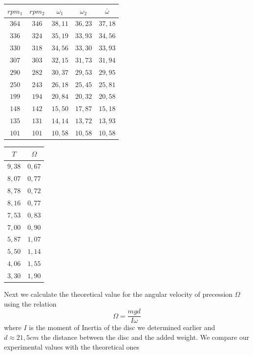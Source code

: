 \documentclass{scrartcl}
\begin{document}
 \medskip
 \centering
 \begin{tabular}{|c|c|c|c|c|}
    \hline
    $rpm_1$ & $rpm_2$ & $\omega_1$ & $\omega_2$ & $\bar{\omega}$ \\
    \hline
    $364$ & $346$ & $38,11$ & $36,23$ & $37,18$ \\
    \hline
    $336$ & $324$ & $35,19$ & $33,93$ & $34,56$ \\
    \hline
    $330$ & $318$ & $34,56$ & $33,30$ & $33,93$ \\
    \hline
    $307$ & $303$ & $32,15$ & $31,73$ & $31,94$ \\
    \hline
    $290$ & $282$ & $30,37$ & $29,53$ & $29,95$ \\
    \hline
    $250$ & $243$ & $26,18$ & $25,45$ & $25,81$ \\
    \hline
    $199$ & $194$ & $20,84$ & $20,32$ & $20,58$ \\
    \hline
    $148$ & $142$ & $15,50$ & $17,87$ & $15,18$ \\
    \hline
    $135$ & $131$ & $14,14$ & $13,72$ & $13,93$ \\
    \hline
    $101$ & $101$ & $10,58$ & $10,58$ & $10,58$ \\
    \hline
\end{tabular}
  \quad
   \begin{tabular}{|c|c|}
    \hline
   $T$ & $\Omega$ \\
   \hline
   $9,38$ & $0,67$ \\
   \hline
   $8,07$ & $0,77$ \\
   \hline
   $8,78$ & $0,72$ \\
   \hline
   $8,16$ & $0,77$ \\
   \hline
   $7,53$ & $0,83$ \\
   \hline
   $7,00$ & $0,90$ \\
   \hline
   $5,87$ & $1,07$ \\
   \hline
   $5,50$ & $1,14$ \\
   \hline
   $4,06$ & $1,55$ \\
   \hline
   $3,30$ & $1,90$ \\
   \hline
   \end{tabular}
\flushleft
\medskip
Next we calculate the theoretical value for the angular velocity of precession $\Omega$ using the relation
\begin{equation}
    \boxed{\Omega = \frac{mgd}{I\omega}}
\end{equation}
where $I$ is the moment of Inertia of the disc we determined earlier and $d\approx 21,5cm$ the distance between the disc and the added weight.
We compare our experimental values with the theoretical ones
\medskip
\end{document}
